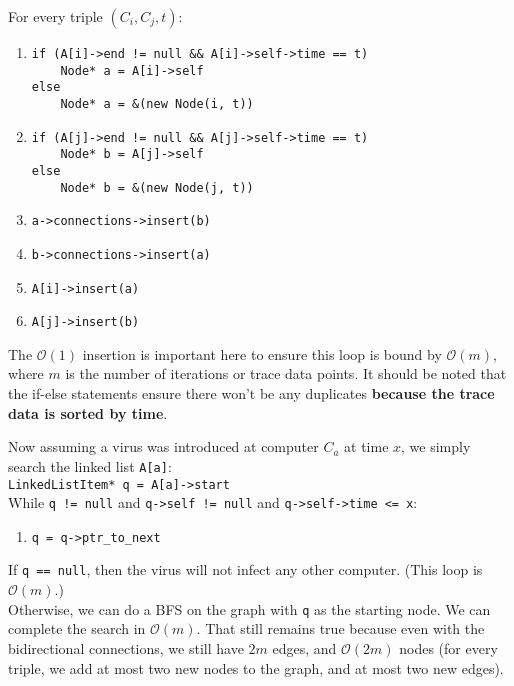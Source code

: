 \documentclass[12pt, letterpaper]{article}
\begin{document}
\noindent For every triple $(C_i, C_j, t)$:
\begin{enumerate}
    \item \verb|if (A[i]->end != null && A[i]->self->time == t)|\\
          \verb|    Node* a = A[i]->self|\\
          \verb|else|\\
          \verb|    Node* a = &(new Node(i, t))|
    \item \verb|if (A[j]->end != null && A[j]->self->time == t)|\\
          \verb|    Node* b = A[j]->self|\\
          \verb|else|\\
          \verb|    Node* b = &(new Node(j, t))|
    \item \verb|a->connections->insert(b)|
    \item \verb|b->connections->insert(a)|
    \item \verb|A[i]->insert(a)|
    \item \verb|A[j]->insert(b)|
\end{enumerate}
The $\mathcal{O}(1)$ insertion is important here to ensure this loop is bound by $\mathcal{O}(m)$, where $m$ is the number of iterations or trace data points.
It should be noted that the if-else statements ensure there won't be any duplicates \textbf{because the trace data is sorted by time}.

Now assuming a virus was introduced at computer $C_a$ at time $x$, we simply search the linked list \verb|A[a]|:\\
\verb|LinkedListItem* q = A[a]->start|\\
While \verb|q != null| and \verb|q->self != null| and \verb|q->self->time <= x|:
\begin{enumerate}
    \item \verb|q = q->ptr_to_next|
\end{enumerate}
If \verb|q == null|, then the virus will not infect any other computer. (This loop is $\mathcal{O}(m)$.)\\
Otherwise, we can do a BFS on the graph with \verb|q| as the starting node.
We can complete the search in $\mathcal{O}(m)$. That still remains true because even with the bidirectional connections, we still have $2m$ edges, and $\mathcal{O}(2m)$ nodes (for every triple, we add at most two new nodes to the graph, and at most two new edges).
\end{document}
